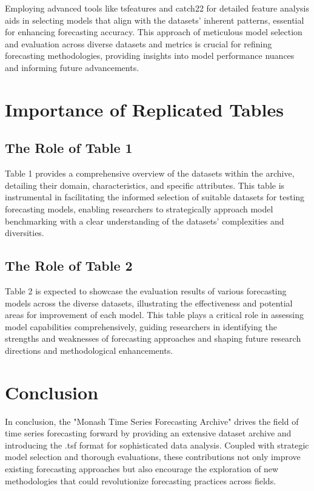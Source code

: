\documentclass{article}
\begin{document}
Employing advanced tools like tsfeatures and catch22 for detailed feature analysis aids in selecting models that align with the datasets' inherent patterns, essential for enhancing forecasting accuracy. This approach of meticulous model selection and evaluation across diverse datasets and metrics is crucial for refining forecasting methodologies, providing insights into model performance nuances and informing future advancements.

\noindent\makebox[\linewidth]{\rule{\textwidth}{0.4pt}}

\section*{Importance of Replicated Tables}

\noindent\makebox[\linewidth]{\rule{\textwidth}{1pt}} 

\subsection*{The Role of Table 1}

Table 1 provides a comprehensive overview of the datasets within the archive, detailing their domain, characteristics, and specific attributes. This table is instrumental in facilitating the informed selection of suitable datasets for testing forecasting models, enabling researchers to strategically approach model benchmarking with a clear understanding of the datasets' complexities and diversities.

\subsection*{The Role of Table 2}

Table 2 is expected to showcase the evaluation results of various forecasting models across the diverse datasets, illustrating the effectiveness and potential areas for improvement of each model. This table plays a critical role in assessing model capabilities comprehensively, guiding researchers in identifying the strengths and weaknesses of forecasting approaches and shaping future research directions and methodological enhancements.

\noindent\makebox[\linewidth]{\rule{\textwidth}{0.4pt}}

\section*{Conclusion}

In conclusion, the "Monash Time Series Forecasting Archive" drives the field of time series forecasting forward by providing an extensive dataset archive and introducing the .tsf format for sophisticated data analysis. Coupled with strategic model selection and thorough evaluations, these contributions not only improve existing forecasting approaches but also encourage the exploration of new methodologies that could revolutionize forecasting practices across fields.
\end{document}
